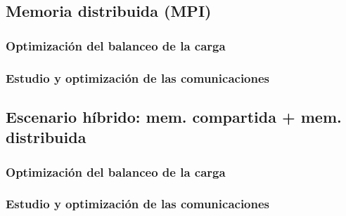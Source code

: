 \documentclass[10pt]{beamer}
\begin{document}
\frame{
}

\subsection{Memoria distribuida (MPI)}

\frame{
}

\subsubsection{Optimización del balanceo de la carga}

\frame{
}

\subsubsection{Estudio y optimización de las comunicaciones}

\frame{
}

\subsection{Escenario híbrido: mem. compartida + mem. distribuida}

\frame{
}

\subsubsection{Optimización del balanceo de la carga}

\frame{
}

\subsubsection{Estudio y optimización de las comunicaciones}

\frame{
}
\end{document}
